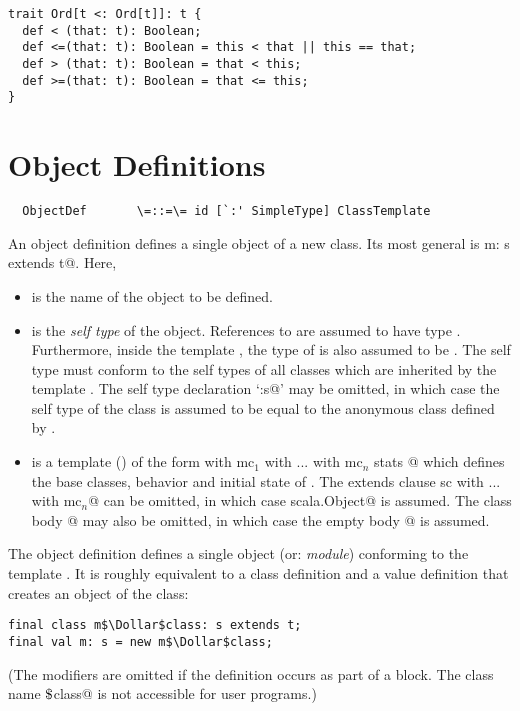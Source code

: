 \documentclass[11pt]{report}
\begin{document}
\begin{verbatim}
trait Ord[t <: Ord[t]]: t {
  def < (that: t): Boolean;
  def <=(that: t): Boolean = this < that || this == that;
  def > (that: t): Boolean = that < this;
  def >=(that: t): Boolean = that <= this;
}
\end{verbatim}

\section{Object Definitions}
\label{sec:modules}
\label{sec:object-defs}

\syntax\begin{verbatim}
  ObjectDef       \=::=\= id [`:' SimpleType] ClassTemplate
\end{verbatim}

An object definition defines a single object of a new class. Its 
most general is
\verb@object m: s extends t@. Here,
\begin{itemize}
\item[]
\verb@m@ is the name of the object to be defined.
\item[] \verb@s@ is the {\em self type} of the object. References to
\verb@m@ are assumed to have type \verb@s@. Furthermore, inside the
template \verb@t@, the type of \verb@this@ is also assumed to be \verb@s@.
The self type must conform to the self types of all classes which are
inherited by the template \verb@t@. The self type declaration
`\verb@:s@' may be omitted, in which case the self type of the class is
assumed to be equal to the anonymous class defined by \verb@t@.
\item[] 
\verb@t@ is a
template () of the form
\verb@sc with mc$_1$ with ... with mc$_n$ { stats }@
which defines the base classes, behavior and initial state of \verb@m@.
The extends clause \verb@extends sc with ... with mc$_n$@
can be omitted, in which case
\verb@extends scala.Object@ is assumed.  The class body
@ may also be omitted, in which case the empty body
\verb@{}@ is assumed.
\end{itemize}
The object definition defines a single object (or: {\em module})
conforming to the template \verb@t@.  It is roughly equivalent to a class
definition and a value definition that creates an object of the class:
\begin{verbatim}
final class m$\Dollar$class: s extends t;
final val m: s = new m$\Dollar$class;
\end{verbatim}
(The \verb@final@ modifiers are omitted if the definition occurs as
part of a block. The class name \verb@m$\Dollar$class@ is not
accessible for user programs.)
\end{document}
